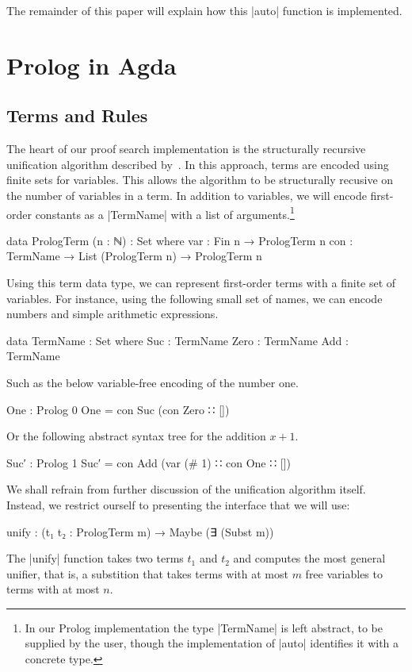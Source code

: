 \documentclass[preprint]{sigplanconf}
\begin{document}
The remainder of this paper will explain how this |auto| function is
implemented.

\section{Prolog in Agda}
\label{sec:prolog}

\subsection*{Terms and Rules}

The heart of our proof search implementation is the structurally recursive
unification algorithm described by~\citet{unification}. In this approach, terms
are encoded using finite sets for variables. This allows the algorithm to
be structurally recusive on the number of variables in a term. In
addition to variables, we will encode first-order constants as a
|TermName| with a list of arguments.\footnote{
  In our Prolog implementation the type |TermName| is left abstract,
  to be supplied by the user, though the implementation of |auto|
  identifies it with a concrete type.
}

\begin{code}
data PrologTerm (n : ℕ) : Set where
  var  : Fin n → PrologTerm n
  con  : TermName → List (PrologTerm n) → PrologTerm n
\end{code}
Using this term data type, we can represent first-order terms with a
finite set of variables. For instance, using the following small set
of names, we can encode numbers and simple arithmetic expressions.
\begin{code}
data TermName : Set where
  Suc   : TermName
  Zero  : TermName
  Add   : TermName
\end{code}
Such as the below variable-free encoding of the number one.
\begin{code}
One : Prolog 0
One = con Suc (con Zero ∷ [])
\end{code}
Or the following abstract syntax tree for the addition $x + 1$.
\begin{code}
Suc′ : Prolog 1
Suc′ = con Add (var (# 1) ∷ con One ∷ [])
\end{code}
We shall refrain from further discussion of the unification algorithm itself.
Instead, we restrict ourself to presenting the interface that we will use:
\begin{code}
  unify  : (t₁ t₂ : PrologTerm m)
         → Maybe (∃ (Subst m))
\end{code}
The |unify| function takes two terms $t_1$ and $t_2$ and computes the most general
unifier, that is, a substition that takes terms with at most $m$ free
variables to terms with at most $n$.
\end{document}

